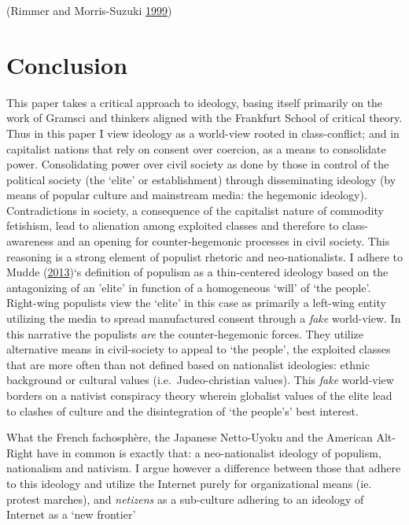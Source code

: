 \documentclass[10pt,british,A4paper,,openany]{memoir}
\begin{document}
(Rimmer and Morris-Suzuki
\protect\hyperlink{ref-rimmer_japanese_1999}{1999})

\section{Conclusion}\label{conclusion-1}

This paper takes a critical approach to ideology, basing itself
primarily on the work of Gramsci and thinkers aligned with the Frankfurt
School of critical theory. Thus in this paper I view ideology as a
world-view rooted in class-conflict; and in capitalist nations that rely
on consent over coercion, as a means to consolidate power. Consolidating
power over civil society as done by those in control of the political
society (the `elite' or establishment) through disseminating ideology
(by means of popular culture and mainstream media: the hegemonic
ideology). Contradictions in society, a consequence of the capitalist
nature of commodity fetishism, lead to alienation among exploited
classes and therefore to class-awareness and an opening for
counter-hegemonic processes in civil society. This reasoning is a strong
element of populist rhetoric and neo-nationalists. I adhere to Mudde
(\protect\hyperlink{ref-mudde_oxford_2013}{2013})`s definition of
populism as a thin-centered ideology based on the antagonizing of an
'elite' in function of a homogeneous `will' of `the people'. Right-wing
populists view the `elite' in this case as primarily a left-wing entity
utilizing the media to spread manufactured consent through a \emph{fake}
world-view. In this narrative the populists \emph{are} the
counter-hegemonic forces. They utilize alternative means in
civil-society to appeal to `the people', the exploited classes that are
more often than not defined based on nationalist ideologies: ethnic
background or cultural values (i.e.~Judeo-christian values). This
\emph{fake} world-view borders on a nativist conspiracy theory wherein
globalist values of the elite lead to clashes of culture and the
disintegration of `the people's' best interest.

What the French fachosphère, the Japanese Netto-Uyoku and the American
Alt-Right have in common is exactly that: a neo-nationalist ideology of
populism, nationalism and nativism. I argue however a difference between
those that adhere to this ideology and utilize the Internet purely for
organizational means (ie. protest marches), and \emph{netizens} as a
sub-culture adhering to an ideology of Internet as a `new frontier'
\end{document}
